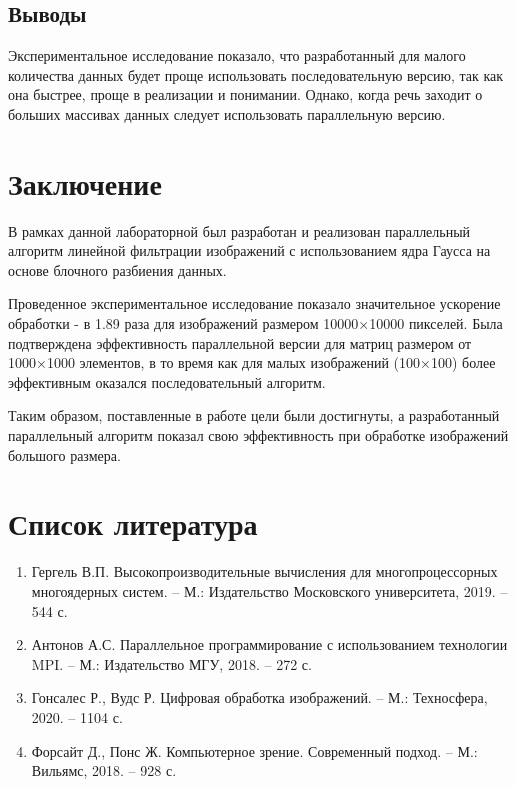 \documentclass[14pt]{extarticle}
\theoremstyle{definition}
\theoremstyle{remark}
\begin{document}
\subsection{Выводы}
Экспериментальное исследование показало, что разработанный для малого количества данных будет проще использовать последовательную версию, так как она быстрее, проще в реализации и понимании. Однако, когда речь заходит о больших массивах данных следует использовать параллельную версию.
\clearpage

\section*{Заключение}

В рамках данной лабораторной был разработан и реализован параллельный алгоритм линейной фильтрации изображений с использованием ядра Гаусса на основе блочного разбиения данных.

Проведенное экспериментальное исследование показало значительное ускорение обработки - в 1.89 раза для изображений размером 10000×10000 пикселей. Была подтверждена эффективность параллельной версии для матриц размером от 1000×1000 элементов, в то время как для малых изображений (100×100) более эффективным оказался последовательный алгоритм.

Таким образом, поставленные в работе цели были достигнуты, а разработанный параллельный алгоритм показал свою эффективность при обработке изображений большого размера.

\newpage
{}
\section*{Список литература}

\begin{enumerate}
\item Гергель В.П. Высокопроизводительные вычисления для многопроцессорных многоядерных систем. -- М.: Издательство Московского университета, 2019. -- 544 с.

\item Антонов А.С. Параллельное программирование с использованием технологии MPI. -- М.: Издательство МГУ, 2018. -- 272 с.

\item Гонсалес Р., Вудс Р. Цифровая обработка изображений. -- М.: Техносфера, 2020. -- 1104 с.

\item Форсайт Д., Понс Ж. Компьютерное зрение. Современный подход. -- М.: Вильямс, 2018. -- 928 с.
\end{enumerate}
\newpage
{}
\end{document}
